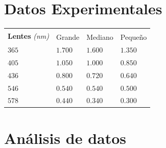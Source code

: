 \documentclass[letterpaper, 12pt]{article}
\begin{document}
\section{Datos Experimentales}

\begin{table}[H]
      \begin{center}
            \begin{tabularx}{.9\linewidth}{|X|>{\centering\arraybackslash}X|>{\centering\arraybackslash}X|>{\centering\arraybackslash}X|}
                  \hline
                  \multicolumn{1}{|c|}{\multirow{2}{*}{\textbf{Lentes} \textit{(nm)}}} & \multicolumn{3}{c|}{\textbf{V}}                     \\
                  \cline{2-4}
                                                                                       & Grande                          & Mediano & Pequeño \\\hline
                  $365$                                                                & $1.700$                         & $1.600$ & $1.350$ \\\hline
                  $405$                                                                & $1.050$                         & $1.000$ & $0.850$ \\\hline
                  $436$                                                                & $0.800$                         & $0.720$ & $0.640$ \\\hline
                  $546$                                                                & $0.540$                         & $0.540$ & $0.500$ \\\hline
                  $578$                                                                & $0.440$                         & $0.340$ & $0.300$ \\\hline

            \end{tabularx}
      \end{center}
\end{table}

\section{Análisis de datos}

\end{document}
